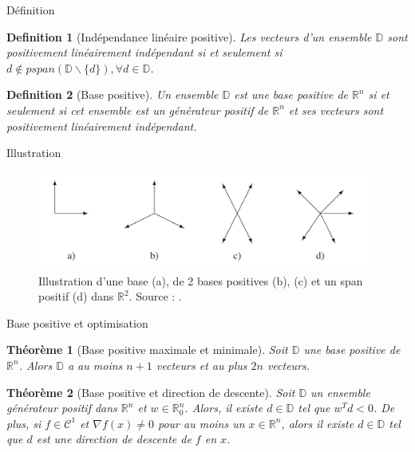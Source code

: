 \documentclass{beamer}
\newtheorem{thm}{Théorème}
\newtheorem{defn}{Definition}
\newcommand{\D}{\mathbb{D}}
\begin{document}
\begin{frame}{Définition}
    \begin{defn}[Indépendance linéaire positive]
        Les vecteurs d'un ensemble $\mathbb{D}$ sont positivement linéairement indépendant si et seulement si $d\not\in pspan(\mathbb{D}\backslash\{d\}), \forall d \in \mathbb{D}$.
    \end{defn}

    \begin{defn}[Base positive]
        Un ensemble $\mathbb{D}$ est une base positive de $\mathbb{R}^n$ si et seulement si cet ensemble est un générateur positif de $\mathbb{R}^n$ et ses vecteurs sont positivement linéairement indépendant.
    \end{defn}
    
\end{frame}

\begin{frame}{Illustration}
    \begin{figure}
    \centering
    \includegraphics[width = 11cm]{illustration_pspan_pbases.png}
    \caption{Illustration d'une base (a), de 2 bases positives (b), (c) et un span positif (d) dans $\mathbb{R}^2$. Source : \cite{AuHa2017a}.}
    \label{fig:bases,pspan, pLI}
\end{figure}
\end{frame}


\begin{frame}{Base positive et optimisation}
    \begin{thm}[Base positive maximale et minimale]
        Soit $\D$ une base positive de $\mathbb{R}^n$. Alors $\D$ a au moins $n+1$ vecteurs et au plus $2n$ vecteurs.
    \end{thm}
    
    \begin{thm}[Base positive et direction de descente]
        Soit $\D$ un ensemble générateur positif dans $\mathbb{R}^n$ et $w \in \mathbb{R}_0^n$.
    Alors, il existe $d \in \D$ tel que $w^T d < 0$. De plus, si $f \in \mathcal{C}^1$ et $\nabla f(x) \neq 0 $ pour au moins un $x \in \mathbb{R}^n$, alors il existe $d \in \D$ tel que $d$ est une direction de descente de $f$ en $x$.
    \end{thm}

\end{frame}
\end{document}
